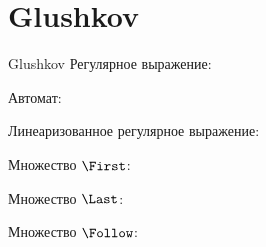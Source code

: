 \section{Glushkov}
\begin{frame}{Glushkov}
	Регулярное выражение:

	Автомат:


	Линеаризованное регулярное выражение:


	Множество $\First$:


	Множество $\Last$:


	Множество $\Follow$:


\end{frame}




